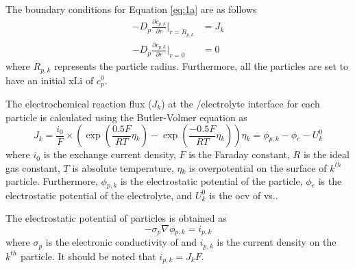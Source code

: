 \documentclass{article}
\begin{document}
The boundary conditions for Equation \ref{eq:1a} are as
follows\cite{newman1993,newman1994}
\begin{subequations}
    \begin{align}
      -D_p\frac{\partial c_{p,k}}{\partial r}|_{r=R_{p,k}} &= J_{k} \label{eq:1b} \\
      -D_p\frac{\partial c_{p,k}}{\partial r}|_{r=0} &= 0 \label{eq:1c}
    \end{align}
\end{subequations}
where $R_{p,k}$ represents the particle radius. Furthermore, all the
particles are set to have an initial \gls{xLi} of $c_p^0$.

The electrochemical reaction flux ($J_k$) at the \nca{}/electrolyte
interface for each particle is calculated using the Butler-Volmer
equation as\cite{newman1993,newman1994}
\begin{subequations}
  \begin{equation}
    J_k = \frac{i_0}{F}\times\left(\exp \left(\frac{0.5F}{RT}\eta{}_k\right)-\exp
    \left(\frac{-0.5F}{RT}\eta{}_k\right)\right)
    \label{eq:2a}
  \end{equation}
  \begin{equation}
    \eta{}_k=\phi{}_{p,k}-\phi{}_e-U_k^0
    \label{eq:2b}
  \end{equation}
\end{subequations}
where $i_0$ is the exchange current density, $F$ is the Faraday
constant, $R$ is the ideal gas constant, $T$ is absolute temperature,
$\eta{}_k$ is overpotential on the surface of $k^{\mathit{th}}$
particle. Furthermore, $\phi{}_{p,k}$ is the electrostatic potential of the
particle, $\phi{}_e$ is the electrostatic potential of the electrolyte, and
$U_k^0$ is the \gls{ocv} of \nca{} vs..

The electrostatic potential of \nca{} particles is obtained as\cite{newman1993,newman1994}
\begin{equation}
  -\sigma{}_p\nabla{}\phi{}_{p,k}=i_{p,k}
  \label{eq:3}
\end{equation}
where $\sigma{}_p$ is the electronic conductivity of \nca{} and $i_{p,k}$ is
the current density on the $k^{\mathit{th}}$ particle. It should be
noted that $i_{p,k}=J_kF$.
\end{document}
